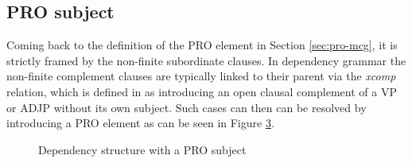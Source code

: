 \subsection{PRO subject}
    Coming back to the definition of the PRO element in Section \ref{sec:pro-mcg}, it is strictly framed by the non-finite subordinate clauses. In dependency grammar the non-finite complement clauses are typically linked to their parent via the \textit{xcomp} relation, which is defined in \cite{Marneffe2008} as introducing an open clausal complement of a VP or ADJP without its own subject. Such cases can then can be resolved by introducing a PRO element as can be seen in Figure \ref{fig:xcomp-ex}.

    
    \begin{figure}[!ht]
        \centering
        \begin{subfigure}[t]{0.42\linewidth}
            \caption{}
            \label{fig:xcomp-ex1}
        \end{subfigure}
        \begin{subfigure}[t]{0.578\linewidth}
            \caption{}
            \label{fig:xcomp-ex2}
        \end{subfigure}
        \caption{Dependency structure with a PRO subject}
        \label{fig:xcomp-ex}
    \end{figure}

